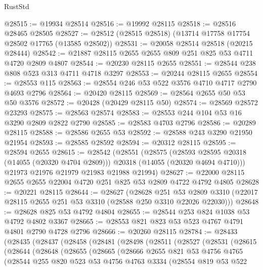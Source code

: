 \begin{lexlean}{RustStd}
\begin{coremodule}
@28515 := @19934 @28514
@28516 := @19992 @28115
@28518 := @28516 @28465 @28505
@28527 := @28512 (@28515 @28518) (@13714 @17758 @17754 @28502 @17765 (@13585 @28502))
@28531 := @20058 @28514 @28518 (@20215 @28444)
@28542 := @21887 @28115 @2655 @2655 @809 @251 @825 @53 @4711 @4720 @2809 @4807
@28544 := @20230 @28115 @2655
@28551 := @28544 @238 @808 @523 @313 @4711 @4718 @3297
@28553 := @20244 @28115 @2655
@28554 := @28553 @115
@28563 := @28554 @246 @53 @522 @3576 @4710 @4717 @2790 @4693 @2796
@28564 := @20420 @28115
@28569 := @28564 @2655 @50 @53 @50 @3576
@28572 := @20428 (@20429 @28115 @50)
@28574 := @28569 @28572 @23293
@28575 := @28563 @28574
@28583 := @28553 @244 @104 @53 @16 @3290 @2809 @2822 @2790
@28585 := @28583 @4703 @2796
@28586 := @20289 @28115
@28588 := @28586 @2655 @53
@28592 := @28588 @243 @3290 @21950 @21954
@28593 := @28585 @28592
@28594 := @20312 @28115
@28595 := @28594 @2655
@28615 := @28542
    (@28551
      (@28575
        (@28593 @28595 @20318 (@14055 (@20320 @4704 @2809)))
        @20318
        (@14055 (@20320 @4694 @4710)))
      @21973
      @21976
      @21979
      @21983
      @21988
      @21994)
@28627 := @22000 @28115 @2655 @2655 @22004 @4720 @251 @825 @53 @2809 @4722 @4792 @4805
@28628 := @20221 @28115
@28644 := @28627
    (@28628
      @251
      @53
      @2809
      @3310
      (@22017 @28115 @2655 @251 @53 @3310 (@28588 @250 @3310 @22026 @22030)))
@28648 := @28628 @825 @53 @4792 @4804
@28655 := @28544 @253 @824 @1038 @53 @4792 @4802 @3367
@28665 := @28553 @821 @823 @53 @523 @4767 @4791 @4801 @2790 @4728 @2796
@28666 := @20260 @28115
@28784 := @28433
    (@28435
      (@28437
        (@28458
          (@28481
            (@28498
              (@28511
                (@28527
                  (@28531
                    (@28615
                      (@28644
                        (@28648
                          (@28655
                            (@28665
                              (@28666
                                @2655
                                @821
                                @53
                                @4756
                                @4765
                                (@28544
                                  @255
                                  @820
                                  @523
                                  @53
                                  @4756
                                  @4763
                                  @3334
                                  (@28554
                                    @819
                                    @53
                                    @522

\end{coremodule}
\end{lexlean}
